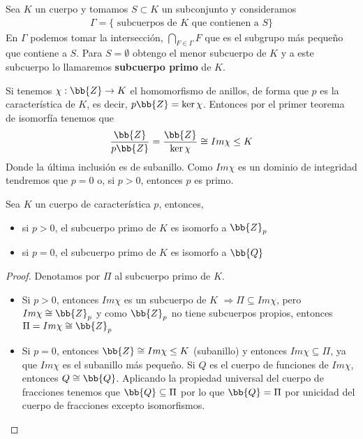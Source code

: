 \begin{definicion}
    Sea $K$ un cuerpo y tomamos $S\subset K$ un subconjunto y consideramos
    \begin{gather*}
        \Gamma = \{\text{ subcuerpos de }K \text{ que contienen a }S\}
    \end{gather*}
    En $\Gamma$ podemos tomar la intersección, $\bigcap\limits_{F\in\Gamma}F$ que es el subgrupo más pequeño que contiene a $S$. Para $S=\emptyset$ obtengo el menor subcuerpo de $K$ y a este subcuerpo lo llamaremos \textbf{subcuerpo primo} de $K$.
\end{definicion}

\begin{observacion}
    Si tenemos $\chi: \bb{Z} \to K$ el homomorfismo de anillos, de forma que $p$ es la característica de $K$, es decir, $p\bb{Z} = \ker\chi$. Entonces por el primer teorema de isomorfía tenemos que
    \begin{gather*}
        \frac{\bb{Z}}{p\bb{Z}} = \frac{\bb{Z}}{\ker\chi} \cong  Im\chi \leq K
    \end{gather*}
    Donde la última inclusión es de subanillo. Como $Im\chi$ es un dominio de integridad tendremos que $p=0$ o, si $p>0$, entonces $p$ es primo.
\end{observacion}

\begin{prop}
    Sea $K$ un cuerpo de característica $p$, entonces, 
    \begin{itemize}
        \item si $p>0$, el subcuerpo primo de $K$ es isomorfo a $\bb{Z}_p$
        \item si $p=0$, el subcuerpo primo de $K$ es isomorfo a $\bb{Q}$
    \end{itemize}
    \begin{proof}
        Denotamos por $\Pi$ al subcuerpo primo de $K$.
        \begin{itemize}
            \item Si $p>0$, entonces $Im\chi$ es un subcuerpo de $K$ $\Rightarrow \Pi\subseteq Im\chi$, pero $Im\chi\cong \bb{Z}_p$ y como $\bb{Z}_p$ no tiene subcuerpos propios, entonces $\Pi = Im\chi \cong\bb{Z}_p$
            
            \item Si $p=0$, entonces $\bb{Z}\cong Im\chi \leq K$ (subanillo) y entonces $Im\chi\subseteq \Pi$, ya que $Im\chi$ es el subanillo más pequeño. Si $Q$ es el cuerpo de funciones de $Im\chi$, entonces $Q\cong \bb{Q}$. Aplicando la propiedad universal del cuerpo de fracciones tenemos que $\bb{Q}\subseteq \Pi$ por lo que $\bb{Q}=\Pi$ por unicidad del cuerpo de fracciones excepto isomorfismos.
        \end{itemize}
    \end{proof}
\end{prop}

